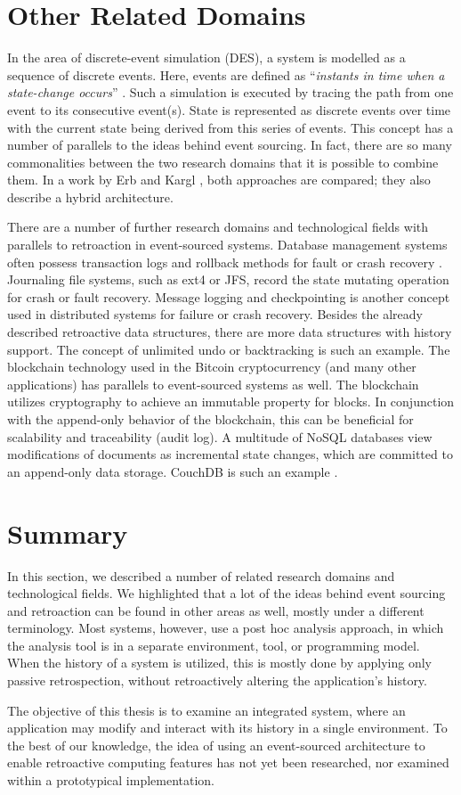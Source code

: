 \section{Other Related Domains}
In the area of discrete-event simulation (DES), a system is modelled as a sequence 
of discrete events. Here, events are defined as ``\emph{instants in time when a 
state-change occurs}'' \cite{Robinson2004}. 
Such a simulation is executed by tracing the path from one event to its consecutive 
event(s). State is represented as discrete events over time with the current state 
being derived from this series of events. This concept has a number of parallels 
to the ideas behind event sourcing.
In fact, there are so many commonalities between the two research domains that 
it is possible to combine them. In a work by Erb and Kargl \cite{Erb2014}, both 
approaches are compared; they also describe a hybrid architecture.

There are a number of further research domains and technological fields with parallels 
to retroaction in event-sourced systems. Database management systems often possess 
transaction logs and rollback methods for fault or crash recovery \cite{Ramakrishnan2000}. 
Journaling file systems, such as ext4 or JFS, record the state mutating operation for 
crash or fault recovery.
Message logging and checkpointing is another concept used in distributed systems for 
failure or crash recovery.
Besides the already described retroactive data structures, there are more data structures 
with history support. The concept of unlimited undo or backtracking \cite{Apostolico1994}
is such an example.
The blockchain technology \cite{Swan2015} used in the Bitcoin cryptocurrency (and many 
other applications) has parallels to event-sourced systems as well. The blockchain 
utilizes cryptography to achieve an immutable property for blocks. In conjunction with 
the append-only behavior of the blockchain, this can be beneficial for scalability and 
traceability (audit log). 
%
A multitude of NoSQL databases view modifications of documents as incremental state 
changes, which are committed to an append-only data storage. CouchDB is such an example 
\cite{Anderson2010}.


\section{Summary}
In this section, we described a number of related research domains and technological 
fields. We highlighted that a lot of the ideas behind event sourcing and retroaction 
can be found in other areas as well, mostly under a different terminology.
%
Most systems, however, use a post hoc analysis approach, in which the analysis tool 
is in a separate environment, tool, or programming model. When the history of a 
system is utilized, this is mostly done by applying only passive retrospection, 
without retroactively altering the application's history.

The objective of this thesis is to examine an integrated system, where an application 
may modify and interact with its history in a single environment. To the best of our 
knowledge, the idea of using an event-sourced architecture to enable retroactive 
computing features has not yet been researched, nor examined within a prototypical 
implementation.

